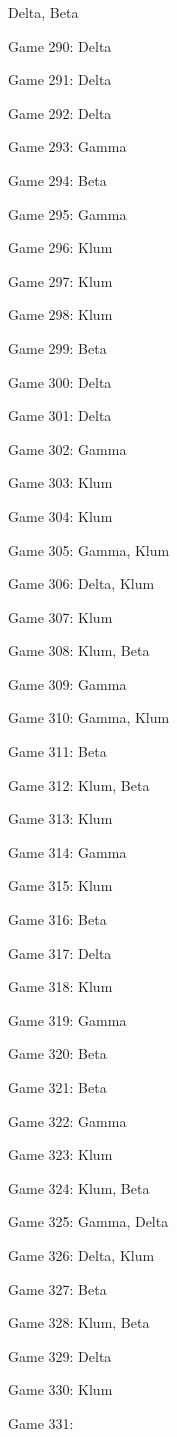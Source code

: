 \documentclass{article}
\begin{document}
\begin{multicols}{3}
\begin{compactitem}
Delta, Beta
\item Game 290:
Delta
\item Game 291:
Delta
\item Game 292:
Delta
\item Game 293:
Gamma
\item Game 294:
Beta
\item Game 295:
Gamma
\item Game 296:
Klum
\item Game 297:
Klum
\item Game 298:
Klum
\item Game 299:
Beta
\item Game 300:
Delta
\item Game 301:
Delta
\item Game 302:
Gamma
\item Game 303:
Klum
\item Game 304:
Klum
\item Game 305:
Gamma, Klum
\item Game 306:
Delta, Klum
\item Game 307:
Klum
\item Game 308:
Klum, Beta
\item Game 309:
Gamma
\item Game 310:
Gamma, Klum
\item Game 311:
Beta
\item Game 312:
Klum, Beta
\item Game 313:
Klum
\item Game 314:
Gamma
\item Game 315:
Klum
\item Game 316:
Beta
\item Game 317:
Delta
\item Game 318:
Klum
\item Game 319:
Gamma
\item Game 320:
Beta
\item Game 321:
Beta
\item Game 322:
Gamma
\item Game 323:
Klum
\item Game 324:
Klum, Beta
\item Game 325:
Gamma, Delta
\item Game 326:
Delta, Klum
\item Game 327:
Beta
\item Game 328:
Klum, Beta
\item Game 329:
Delta
\item Game 330:
Klum
\item Game 331:

\end{compactitem}
\end{multicols}
\end{document}
